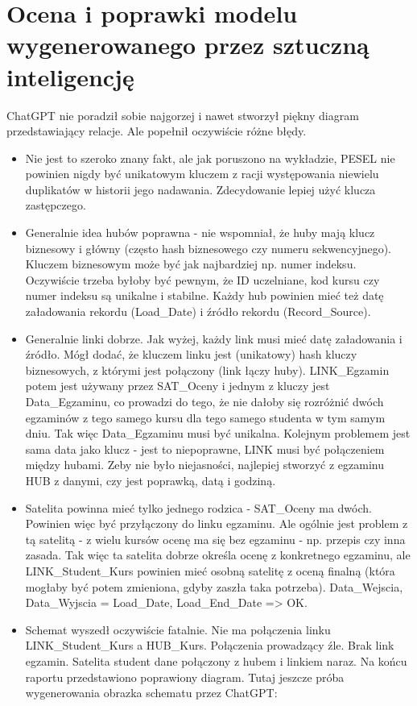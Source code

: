 \documentclass{article}
\begin{document}
\section{Ocena i poprawki modelu wygenerowanego przez sztuczną inteligencję}

ChatGPT nie poradził sobie najgorzej i nawet stworzył piękny diagram przedstawiający relacje. Ale popełnił oczywiście różne błędy.

\begin{itemize}
  \item Nie jest to szeroko znany fakt, ale jak poruszono na wykładzie, PESEL nie powinien nigdy być unikatowym kluczem z racji występowania niewielu duplikatów w historii jego nadawania. Zdecydowanie lepiej użyć klucza zastępczego.
  \item Generalnie idea hubów poprawna - nie wspomniał, że huby mają klucz biznesowy i główny (często hash biznesowego czy numeru sekwencyjnego). Kluczem biznesowym może być jak najbardziej np. numer indeksu. Oczywiście trzeba byłoby być pewnym, że ID uczelniane, kod kursu czy numer indeksu są unikalne i stabilne. Każdy hub powinien mieć też datę załadowania rekordu (Load\_Date) i źródło rekordu (Record\_Source).
  \item Generalnie linki dobrze. Jak wyżej, każdy link musi mieć datę załadowania i źródło. Mógł dodać, że kluczem linku jest (unikatowy) hash kluczy biznesowych, z którymi jest połączony (link łączy huby). LINK\_Egzamin potem jest używany przez SAT\_Oceny i jednym z kluczy jest Data\_Egzaminu, co prowadzi do tego, że nie dałoby się rozróżnić dwóch egzaminów z tego samego kursu dla tego samego studenta w tym samym dniu. Tak więc Data\_Egzaminu musi być unikalna. Kolejnym problemem jest sama data jako klucz - jest to niepoprawne, LINK musi być połączeniem między hubami. Zeby nie było niejasności, najlepiej stworzyć z egzaminu HUB z danymi, czy jest poprawką, datą i godziną.
  \item Satelita powinna mieć tylko jednego rodzica - SAT\_Oceny ma dwóch. Powinien więc być przyłączony do linku egzaminu. Ale ogólnie jest problem z tą satelitą - z wielu kursów ocenę ma się bez egzaminu - np. przepis czy inna zasada. Tak więc ta satelita dobrze określa ocenę z konkretnego egzaminu, ale LINK\_Student\_Kurs powinien mieć osobną satelitę z oceną finalną (która mogłaby być potem zmieniona, gdyby zaszła taka potrzeba). Data\_Wejscia, Data\_Wyjscia = Load\_Date, Load\_End\_Date => OK.
  \item Schemat wyszedł oczywiście fatalnie. Nie ma połączenia linku LINK\_Student\_Kurs a HUB\_Kurs. Połączenia prowadzący źle. Brak link egzamin. Satelita student dane połączony z hubem i linkiem naraz. Na końcu raportu przedstawiono poprawiony diagram. Tutaj jeszcze próba wygenerowania obrazka schematu przez ChatGPT:

\end{itemize}
\end{document}
